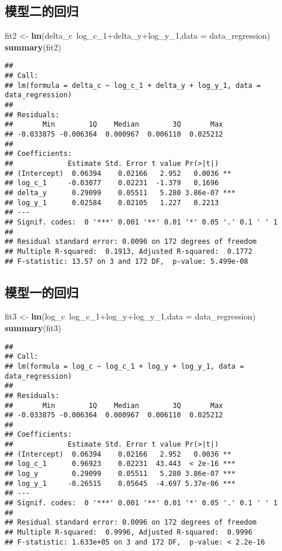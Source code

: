 \documentclass[]{article}
\newenvironment{Shaded}{\begin{snugshade}}{\end{snugshade}}
\newcommand{\KeywordTok}[1]{\textcolor[rgb]{0.13,0.29,0.53}{\textbf{{#1}}}}
\newcommand{\DataTypeTok}[1]{\textcolor[rgb]{0.13,0.29,0.53}{{#1}}}
\newcommand{\StringTok}[1]{\textcolor[rgb]{0.31,0.60,0.02}{{#1}}}
\newcommand{\NormalTok}[1]{{#1}}
\begin{document}
\subsection{模型二的回归}

\begin{Shaded}
\begin{Highlighting}[]
\NormalTok{fit2 <-}\StringTok{ }\KeywordTok{lm}\NormalTok{(delta_c~log_c_1+delta_y+log_y_1,}\DataTypeTok{data =} \NormalTok{data_regression)}
\KeywordTok{summary}\NormalTok{(fit2)}
\end{Highlighting}
\end{Shaded}

\begin{verbatim}
## 
## Call:
## lm(formula = delta_c ~ log_c_1 + delta_y + log_y_1, data = data_regression)
## 
## Residuals:
##       Min        1Q    Median        3Q       Max 
## -0.033875 -0.006364  0.000967  0.006110  0.025212 
## 
## Coefficients:
##             Estimate Std. Error t value Pr(>|t|)    
## (Intercept)  0.06394    0.02166   2.952   0.0036 ** 
## log_c_1     -0.03077    0.02231  -1.379   0.1696    
## delta_y      0.29099    0.05511   5.280 3.86e-07 ***
## log_y_1      0.02584    0.02105   1.227   0.2213    
## ---
## Signif. codes:  0 '***' 0.001 '**' 0.01 '*' 0.05 '.' 0.1 ' ' 1
## 
## Residual standard error: 0.0096 on 172 degrees of freedom
## Multiple R-squared:  0.1913, Adjusted R-squared:  0.1772 
## F-statistic: 13.57 on 3 and 172 DF,  p-value: 5.499e-08
\end{verbatim}

\subsection{模型一的回归}

\begin{Shaded}
\begin{Highlighting}[]
\NormalTok{fit3 <-}\StringTok{ }\KeywordTok{lm}\NormalTok{(log_c~log_c_1+log_y+log_y_1,}\DataTypeTok{data =} \NormalTok{data_regression)}
\KeywordTok{summary}\NormalTok{(fit3)}
\end{Highlighting}
\end{Shaded}

\begin{verbatim}
## 
## Call:
## lm(formula = log_c ~ log_c_1 + log_y + log_y_1, data = data_regression)
## 
## Residuals:
##       Min        1Q    Median        3Q       Max 
## -0.033875 -0.006364  0.000967  0.006110  0.025212 
## 
## Coefficients:
##             Estimate Std. Error t value Pr(>|t|)    
## (Intercept)  0.06394    0.02166   2.952   0.0036 ** 
## log_c_1      0.96923    0.02231  43.443  < 2e-16 ***
## log_y        0.29099    0.05511   5.280 3.86e-07 ***
## log_y_1     -0.26515    0.05645  -4.697 5.37e-06 ***
## ---
## Signif. codes:  0 '***' 0.001 '**' 0.01 '*' 0.05 '.' 0.1 ' ' 1
## 
## Residual standard error: 0.0096 on 172 degrees of freedom
## Multiple R-squared:  0.9996, Adjusted R-squared:  0.9996 
## F-statistic: 1.633e+05 on 3 and 172 DF,  p-value: < 2.2e-16
\end{verbatim}
\end{document}
